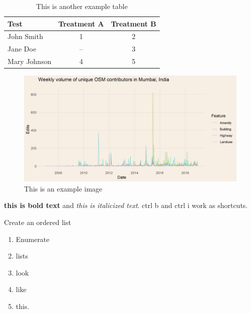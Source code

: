 \begin{table}[ht]
\centering
\caption{This is another example table}
\begin{tabular}[t]{lcc}
\toprule
Test&Treatment A&Treatment B\\
\midrule
John Smith&1&2\\
Jane Doe&--&3\\
Mary Johnson&4&5\\
\bottomrule
\end{tabular}
\end{table}%

\begin{figure} [H] %
    \centering %
    \includegraphics[width = \textwidth]{Images/mb_users_agg.png} %
    \caption{This is an example image} %
    \label{fig:four} %
\end{figure}

\textbf{this is bold text} and \textit{this is italicized text}. ctrl b and ctrl i work as shortcuts. 

Create an ordered list 

\begin{enumerate}
    \item Enumerate
    \item lists
    \item look
    \item like
    \item this.
\end{enumerate}

